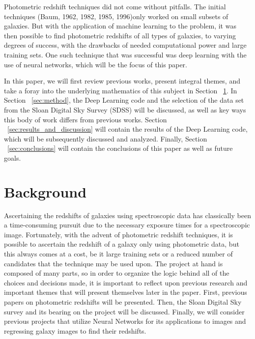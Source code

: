\documentclass[fleqn,usenatbib]{mnras}
\begin{document}
Photometric redshift techniques did not come without pitfalls. The initial techniques (Baum, 1962, 1982, 1985, 1996)only worked on small subsets of galaxies. But with the application of machine learning to the problem, it was then possible to find photometric redshifts of all types of galaxies, to varying degrees of success, with the drawbacks of needed computational power and large training sets.  One such technique that was successful was deep learning with the use of neural networks, which will be the focus of this paper.

In this paper, we will first review previous works, present integral themes, and take a foray into the underlying mathematics of this subject in Section ~\ref{sec:review}.  In Section ~\ref{sec:method}, the Deep Learning code and the selection of the data set from the Sloan Digital Sky Survey (SDSS) will be discussed, as well as key ways this body of work differs from previous works.  Section ~\ref{sec:results_and_discussion} will contain the results of the Deep Learning code, which will be subsequently discussed and analyzed.  Finally, Section ~\ref{sec:conclusions} will contain the conclusions of this paper as well as future goals.

\section{Background}
  \label{sec:review}
Ascertaining the redshifts of galaxies using spectroscopic data has classically been a time-consuming pursuit due to the necessary exposure times for a spectroscopic image.  Fortunately, with the advent of photometric redshift techniques, it is possible to ascertain the redshift of a galaxy only using photometric data, but this always comes at a cost, be it large training sets or a reduced number of candidates that the technique may be used upon.  The project at hand is composed of many parts, so in order to organize the logic behind all of the choices and decisions made, it is important to reflect upon previous research and important themes that will present themselves later in the paper.  First, previous papers on photometric redshifts will be presented. Then, the Sloan Digital Sky survey and its bearing on the project will be discussed.  Finally, we will consider previous projects that utilize Neural Networks for its applications to images and regressing galaxy images to find their redshifts. 
\end{document}
